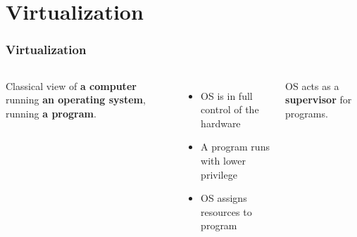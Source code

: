 \section{Virtualization}
\begin{frame}
	\frametitle{Virtualization}
	\begin{columns}
		
		Classical view of \textbf{a computer} running \textbf{an operating system}, running \textbf{a program}.
		\vspace{0.5cm}
		\begin{itemize}
			\item OS is in full control of the hardware
			\item A program runs with lower privilege
			\item OS assigns resources to program
		\end{itemize}
		\vspace{0.5cm}
		OS acts as a \textbf{supervisor} for programs.
		
		\centering
		
	\end{columns}	
\end{frame}

